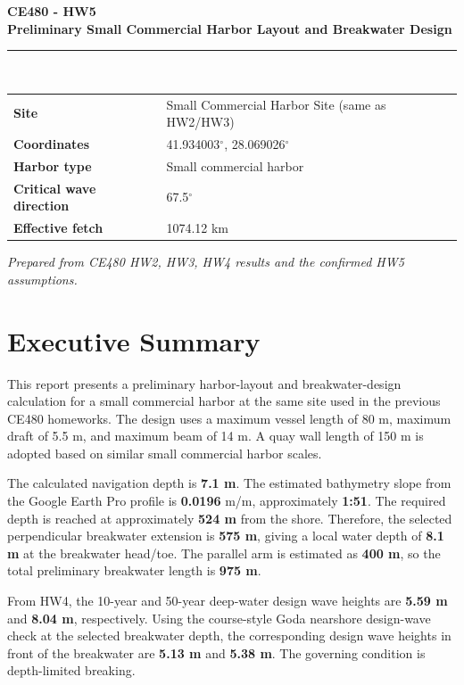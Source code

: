 \documentclass[11pt,a4paper]{article}
\begin{document}
\begin{titlepage}
\centering
\vspace*{1.8cm}
{\Large \textbf{CE480 - HW5}\\[0.3cm]}
{\LARGE \textbf{Preliminary Small Commercial Harbor Layout and Breakwater Design}\\[0.8cm]}
\rule{0.85\textwidth}{0.6pt}\\[0.6cm]
\begin{tabular}{ll}
\textbf{Site} & Small Commercial Harbor Site (same as HW2/HW3) \\
\textbf{Coordinates} & 41.934003$^\circ$, 28.069026$^\circ$ \\
\textbf{Harbor type} & Small commercial harbor \\
\textbf{Critical wave direction} & 67.5$^\circ$ \\
\textbf{Effective fetch} & 1074.12 km \\
\end{tabular}
\vfill
\textit{Prepared from CE480 HW2, HW3, HW4 results and the confirmed HW5 assumptions.}\\[0.5cm]
\end{titlepage}

\tableofcontents
\newpage

\section{Executive Summary}
This report presents a preliminary harbor-layout and breakwater-design calculation for a small commercial harbor at the same site used in the previous CE480 homeworks. The design uses a maximum vessel length of 80 m, maximum draft of 5.5 m, and maximum beam of 14 m. A quay wall length of 150 m is adopted based on similar small commercial harbor scales.

The calculated navigation depth is \textbf{7.1 m}. The estimated bathymetry slope from the Google Earth Pro profile is \textbf{0.0196} m/m, approximately \textbf{1:51}. The required depth is reached at approximately \textbf{524 m} from the shore. Therefore, the selected perpendicular breakwater extension is \textbf{575 m}, giving a local water depth of \textbf{8.1 m} at the breakwater head/toe. The parallel arm is estimated as \textbf{400 m}, so the total preliminary breakwater length is \textbf{975 m}.

From HW4, the 10-year and 50-year deep-water design wave heights are \textbf{5.59 m} and \textbf{8.04 m}, respectively. Using the course-style Goda nearshore design-wave check at the selected breakwater depth, the corresponding design wave heights in front of the breakwater are \textbf{5.13 m} and \textbf{5.38 m}. The governing condition is depth-limited breaking.
\end{document}
